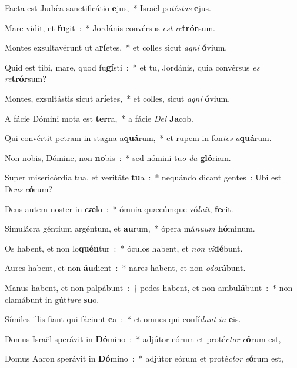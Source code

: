 \item Facta est Judǽa sanctificátio \textbf{e}\-jus,~* Israël po\emph{té}\-\emph{stas} \textbf{e}\-jus.
\item Mare vidit, et \textbf{fu}\-git~:~* Jordánis convérsus \emph{est} \emph{re}\-\textbf{trór}\-sum.
\item Montes exsultavérunt ut a\textbf{rí}\-etes,~* et colles sicut \emph{a}\-\emph{gni} \textbf{ó}\-vi\-um.
\item Quid est tibi, mare, quod fu\textbf{gí}\-sti~:~* et tu, Jordánis, quia convérsus \emph{es} \emph{re}\-\textbf{trór}\-sum?
\item Montes, exsultástis sicut a\textbf{rí}\-etes,~* et colles, sicut \emph{a}\-\emph{gni} \textbf{ó}\-vi\-um.
\item A fácie Dómini mota est \textbf{ter}\-ra,~* a fácie \emph{De}\-\emph{i} \textbf{Ja}\-cob.
\item Qui convértit petram in stagna a\textbf{quá}\-rum,~* et rupem in fon\emph{tes} \emph{a}\-\textbf{quá}\-rum.
\item Non nobis, Dómine, non \textbf{no}\-bis~:~* sed nómini tu\emph{o} \emph{da} \textbf{gló}\-riam.
\item Super misericórdia tua, et veritáte \textbf{tu}\-a~:~* nequándo dicant gentes~: Ubi est De\emph{us} \emph{e}\-\textbf{ó}\-rum?
\item Deus autem noster in \textbf{cæ}\-lo~:~* ómnia quæcúmque vó\emph{lu}\-\emph{it}, \textbf{fe}\-cit.
\item Simulácra géntium argéntum, et \textbf{au}\-rum,~* ópera má\emph{nu}\-\emph{um} \textbf{hó}\-minum.
\item Os habent, et non lo\textbf{quén}\-tur~:~* óculos habent, et \emph{non} \emph{vi}\-\textbf{dé}\-bunt.
\item Aures habent, et non \textbf{áu}\-dient~:~* nares habent, et non \emph{o}\-\emph{do}\-\textbf{rá}\-bunt.
\item Manus habent, et non palpábunt~:~† pedes habent, et non ambu\textbf{lá}\-bunt~:~* non clamábunt in gút\emph{tu}\-\emph{re} \textbf{su}\-o.
\item Símiles illis fiant qui fáciunt \textbf{e}\-a~:~* et omnes qui confí\emph{dunt} \emph{in} \textbf{e}\-is.
\item Domus Israël sperávit in \textbf{Dó}\-mino~:~* adjútor eórum et proté\emph{ctor} \emph{e}\-\textbf{ó}\-rum est,
\item Domus Aaron sperávit in \textbf{Dó}\-mino~:~* adjútor eórum et proté\emph{ctor} \emph{e}\-\textbf{ó}\-rum est,
